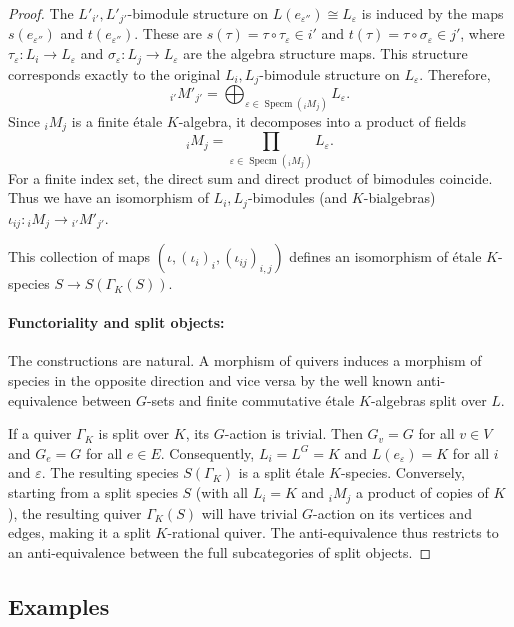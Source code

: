 \documentclass[a4paper,12pt,reqno]{amsart}
\DeclareMathOperator{\Specm}{\mathrm{Specm}}
\theoremstyle{plain}
\theoremstyle{remark}
\begin{document}
\begin{proof}
    The $L'_{i'},L'_{j'}$-bimodule structure on $L(e_{\varepsilon''}) \cong L_\varepsilon$ is induced by the maps $s(e_{\varepsilon''})$ and $t(e_{\varepsilon''})$. These are $s(\tau) = \tau\circ\tau_\varepsilon \in i'$ and $t(\tau) = \tau\circ\sigma_\varepsilon \in j'$, where $\tau_\varepsilon: L_i\to L_\varepsilon$ and $\sigma_\varepsilon: L_j\to L_\varepsilon$ are the algebra structure maps. This structure corresponds exactly to the original $L_i,L_j$-bimodule structure on $L_\varepsilon$. Therefore,
    \[
      {}_{i'}M'_{j'} = \bigoplus_{\varepsilon \in \Specm({}_iM_j)} L_\varepsilon.
    \]
    Since ${}_iM_j$ is a finite \'etale $K$-algebra, it decomposes into a product of fields
    \[
      {}_iM_j = \prod\limits_{\varepsilon \in \Specm({}_iM_j)} L_\varepsilon.
    \]
    For a finite index set, the direct sum and direct product of bimodules coincide. Thus we have an isomorphism of $L_i,L_j$-bimodules (and $K$-bialgebras) $\iota_{ij}\colon {}_iM_j \to {}_{i'}M'_{j'}$.
    
    This collection of maps $(\iota, (\iota_i)_i, (\iota_{ij})_{i,j})$ defines an isomorphism of \'etale $K$-species $S \to S(\Gamma_K(S))$.
    
    \paragraph{Functoriality and split objects:} The constructions are natural. A morphism of quivers induces a morphism of species in the opposite direction and vice versa by the well known anti-equivalence between $G$-sets and finite commutative \'etale $K$-algebras split over $L$.
    
    If a quiver $\Gamma_K$ is split over $K$, its $G$-action is trivial. Then $G_v=G$ for all $v\in V$ and $G_e=G$ for all $e\in E$. Consequently, $L_i=L^G=K$ and $L(e_\varepsilon)=K$ for all $i$ and $\varepsilon$. The resulting species $S(\Gamma_K)$ is a split \'etale $K$-species. Conversely, starting from a split species $S$ (with all $L_i=K$ and ${}_iM_j$ a product of copies of $K$), the resulting quiver $\Gamma_K(S)$ will have trivial $G$-action on its vertices and edges, making it a split $K$-rational quiver. The anti-equivalence thus restricts to an anti-equivalence between the full subcategories of split objects.
  \end{proof}

  \subsection{Examples}
\end{document}
